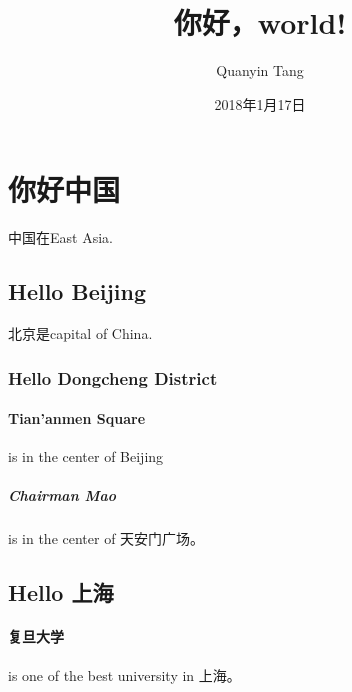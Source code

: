 \documentclass[UTF8]{ctexart}
\title{你好，world!}
\author{Quanyin Tang}
\date{2018年1月17日}
\begin{document}
\maketitle
\tableofcontents
\section{你好中国}
中国在East Asia.
\subsection{Hello Beijing}
北京是capital of China.
\subsubsection{Hello Dongcheng District}
\paragraph{Tian'anmen Square}
is in the center of Beijing
\subparagraph{Chairman Mao}
is in the center of 天安门广场。
\subsection{Hello 上海}
\paragraph{复旦大学} is one of the best university in 上海。
\end{document}
